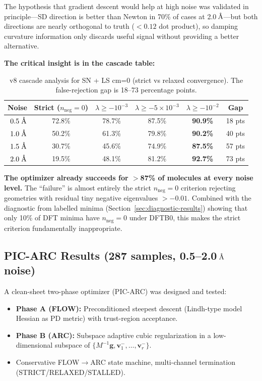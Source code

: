 \documentclass[11pt,a4paper]{article}
\newcommand{\vect}[1]{\mathbf{#1}}
\newcommand{\evec}{\vect{v}}
\newcommand{\eval}{\lambda}
\newcommand{\angstrom}{\text{\r{A}}}
\begin{document}
The hypothesis that gradient descent would help at high noise was validated in principle---SD direction is better than Newton in 70\% of cases at 2.0\,$\angstrom$---but both directions are nearly orthogonal to truth ($< 0.12$ dot product), so damping curvature information only discards useful signal without providing a better alternative.

\textbf{The critical insight is in the cascade table:}

\begin{table}[H]
\centering
\caption{v8 cascade analysis for SN + LS cm=0 (strict vs relaxed convergence). The false-rejection gap is 18--73 percentage points.}
\label{tab:v8-cascade}
\begin{tabular}{rccccc}
\toprule
Noise & Strict ($n_\text{neg}=0$) & $\eval \geq -10^{-3}$ & $\eval \geq -5 \times 10^{-3}$ & $\eval \geq -10^{-2}$ & \textbf{Gap} \\
\midrule
$0.5\;\angstrom$ & 72.8\% & 78.7\% & 87.5\% & \textbf{90.9\%} & 18 pts \\
$1.0\;\angstrom$ & 50.2\% & 61.3\% & 79.8\% & \textbf{90.2\%} & 40 pts \\
$1.5\;\angstrom$ & 30.7\% & 45.6\% & 74.9\% & \textbf{87.5\%} & 57 pts \\
$2.0\;\angstrom$ & 19.5\% & 48.1\% & 81.2\% & \textbf{92.7\%} & 73 pts \\
\bottomrule
\end{tabular}
\end{table}

\textbf{The optimizer already succeeds for $>$87\% of molecules at every noise level.} The ``failure'' is almost entirely the strict $n_\text{neg} = 0$ criterion rejecting geometries with residual tiny negative eigenvalues $> -0.01$. Combined with the diagnostic from labelled minima (Section~\ref{sec:diagnostic-results}) showing that only 10\% of DFT minima have $n_\text{neg} = 0$ under DFTB0, this makes the strict criterion fundamentally inappropriate.

\subsection{PIC-ARC Results (287 samples, 0.5--2.0\,$\angstrom$ noise)}
\label{sec:pic-arc}

A clean-sheet two-phase optimizer (PIC-ARC) was designed and tested:
\begin{itemize}[nosep]
  \item \textbf{Phase A (FLOW):} Preconditioned steepest descent (Lindh-type model Hessian as PD metric) with trust-region acceptance.
  \item \textbf{Phase B (ARC):} Subspace adaptive cubic regularization in a low-dimensional subspace of $\{M^{-1}\vect{g}, \evec_1^{-}, \dots, \evec_r^{-}\}$.
  \item Conservative FLOW$\to$ARC state machine, multi-channel termination (STRICT/RELAXED/STALLED).
\end{itemize}
\end{document}
